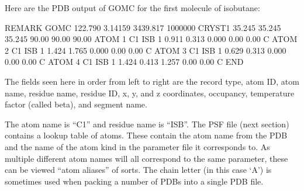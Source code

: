 \documentclass[letterpaper,10pt,english]{sphinxmanual}
\begin{document}
\sphinxAtStartPar
Here are the PDB output of GOMC for the first molecule of isobutane:

\begin{sphinxVerbatim}[commandchars=\\\{\}]
REMARK    GOMC   122.790    3.14159     3439.817     1000000
CRYST1  35.245    35.245    35.245    90.00   90.00   90.00
ATOM    1     C1    ISB     1     0.911    \PYGZhy{}0.313    0.000    0.00    0.00    C
ATOM    2     C1    ISB     1     1.424    \PYGZhy{}1.765    0.000    0.00    0.00    C
ATOM    3     C1    ISB     1    \PYGZhy{}0.629    \PYGZhy{}0.313    0.000    0.00    0.00    C
ATOM    4     C1    ISB     1     1.424     0.413   \PYGZhy{}1.257    0.00    0.00    C
END
\end{sphinxVerbatim}

\sphinxAtStartPar
The fields seen here in order from left to right are the record type, atom ID, atom name, residue name, residue ID, x, y, and z coordinates, occupancy, temperature factor (called beta), and segment name.

\sphinxAtStartPar
The atom name is “C1” and residue name is “ISB”. The PSF file (next section) contains a lookup table of atoms. These contain the atom name from the PDB and
the name of the atom kind in the parameter file it corresponds to. As multiple different atom names will all correspond to the same parameter,
these can be viewed “atom aliases” of sorts. The chain letter (in this case ‘A’) is sometimes used when packing a number of PDBs into a single PDB file.
\end{document}
